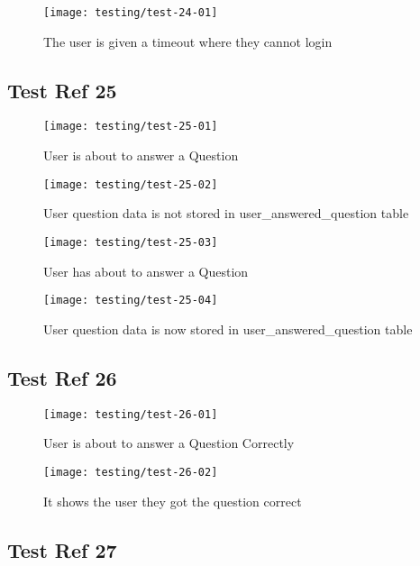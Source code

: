 \begin{figure}[H]
\centering
\texttt{[image: testing/test-24-01]}
\caption{The user is given a timeout where they cannot login}
\label{test-24-02}
\end{figure}

\subsection{Test Ref 25}

\begin{figure}[H]
\centering
\texttt{[image: testing/test-25-01]}
\caption{User is about to answer a Question}
\label{test-25-01}
\end{figure}

\begin{figure}[H]
\centering
\texttt{[image: testing/test-25-02]}
\caption{User question data is not stored in user\_answered\_question table}
\label{test-25-01}
\end{figure}

\begin{figure}[H]
\centering
\texttt{[image: testing/test-25-03]}
\caption{User has about to answer a Question}
\label{test-25-03}
\end{figure}

\begin{figure}[H]
\centering
\texttt{[image: testing/test-25-04]}
\caption{User question data is now stored in user\_answered\_question table}
\label{test-25-04}
\end{figure}

\subsection{Test Ref 26}

\begin{figure}[H]
\centering
\texttt{[image: testing/test-26-01]}
\caption{User is about to answer a Question Correctly}
\label{test-26-01}
\end{figure}

\begin{figure}[H]
\centering
\texttt{[image: testing/test-26-02]}
\caption{It shows the user they got the question correct}
\label{test-26-01}
\end{figure}

\subsection{Test Ref 27}

